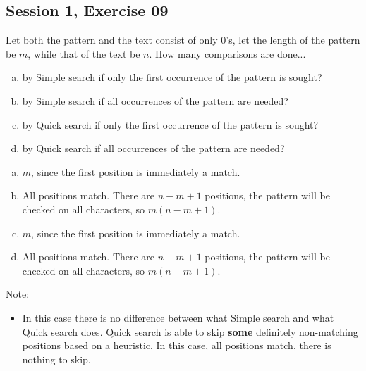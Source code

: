 \subsection{Session 1, Exercise 09}


Let both the pattern and the text consist of only $0$'s, let the length of the pattern be $m$, while that of the text be $n$. How many comparisons are done...

\begin{enumerate}[a.)]
    \item by Simple search if only the first occurrence of the pattern is sought?
    \item by Simple search if all occurrences of the pattern are needed?
    \item by Quick search if only the first occurrence of the pattern is sought?
    \item by Quick search if all occurrences of the pattern are needed?
\end{enumerate}


\begin{enumerate}[a.)]
    \item $m$, since the first position is immediately a match.
    \item All positions match. There are $n-m+1$ positions, the pattern will be checked on all characters, so $m(n-m+1)$.
    \item $m$, since the first position is immediately a match.
    \item All positions match. There are $n-m+1$ positions, the pattern will be checked on all characters, so $m(n-m+1)$.
\end{enumerate}

Note:
\begin{itemize}
    \item In this case there is no difference between what Simple search and what Quick search does. Quick search is able to skip \textbf{some} definitely non-matching positions based on a heuristic. In this case, all positions match, there is nothing to skip.
\end{itemize}
